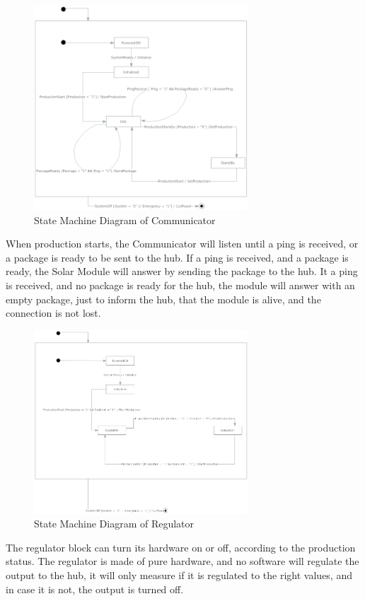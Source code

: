 \documentclass[12pt,a4paper]{report}
\begin{document}
\begin{figure}[htbp]
\centering
\includegraphics[width=8cm]{images/CommunicatorUML}
\caption{State Machine Diagram of Communicator}
\label{fig:CommunicatorUML}
\end{figure}


When production starts, the Communicator will listen until a ping is received, or a package is ready to be sent to the hub. If a ping is received, and a package is ready, the Solar Module will answer by sending the package to the hub. It a ping is received, and no package is ready for the hub, the module will answer with an empty package, just to inform the hub, that the module is alive, and the connection is not lost.

\begin{figure}[htbp]
\centering
\includegraphics[width=8cm]{images/RegulatorUML}
\caption{State Machine Diagram of Regulator}
\label{fig:RegulatorUML}
\end{figure}


The regulator block can turn its hardware on or off, according to the production status. The regulator is made of pure hardware, and no software will regulate the output to the hub, it will only measure if it is regulated to the right values, and in case it is not, the output is turned off.
\end{document}
